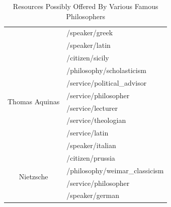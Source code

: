 \begin{table}
\begin{center}
\begin{tabular}{| c | l |}
                                                                 & /speaker/greek \\
                                                                 & /speaker/latin \\
                        \hline
                          \multirow{8}{*}{Thomas Aquinas}        & /citizen/sicily \\
                                                                 & /philosophy/scholasticism \\
                                                                 & /service/political\_advisor \\
                                                                 & /service/philosopher \\
                                                                 & /service/lecturer \\
                                                                 & /service/theologian \\
                                                                 & /service/latin \\
                                                                 & /speaker/italian \\
                        \hline
                          \multirow{4}{*}{Nietzsche}             & /citizen/prussia \\
                                                                 & /philosophy/weimar\_classicism \\
                                                                 & /service/philosopher \\
                                                                 & /speaker/german \\
                        \hline
                \end{tabular}
        \end{center}
        \caption{Resources Possibly Offered By Various Famous Philosophers}
        \label{tbl:res-philosopher}
\end{table}

